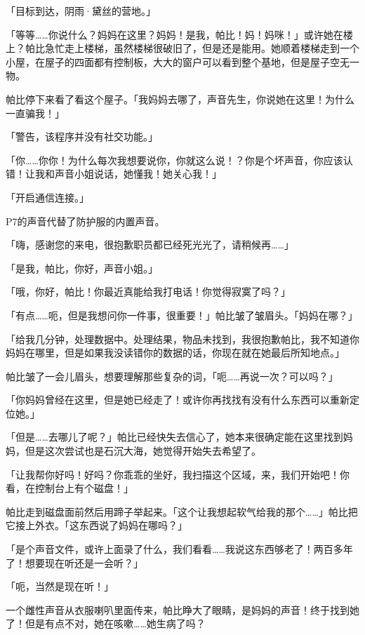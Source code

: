 「目标到达，阴雨·黛丝的营地。」

「等等……你说什么？妈妈在这里？妈妈！是我，帕比！妈！妈咪！」或许她在楼上？帕比急忙走上楼梯，虽然楼梯很破旧了，但是还是能用。她顺着楼梯走到一个小屋，在屋子的四面都有控制板，大大的窗户可以看到整个基地，但是屋子空无一物。

帕比停下来看了看这个屋子。「我妈妈去哪了，声音先生，你说她在这里！为什么一直骗我！」

「{\mtzh 警告，该程序并没有社交功能。}」

「你……你你！为什么每次我想要说你，你就这么说！？你是个坏声音，你应该认错！让我和声音小姐说话，她懂我！她关心我！」

「{\mtzh 开启通信连接。}」

 P7的声音代替了防护服的内置声音。

「嗨，感谢您的来电，很抱歉职员都已经死光光了，请稍候再……」

「是我，帕比，你好，声音小姐。」

「哦，你好，帕比！你最近真能给我打电话！你觉得寂寞了吗？」

「有点……呃，但是我想问你一件事，很重要！」帕比皱了皱眉头。「妈妈在哪？」

「给我几分钟，处理数据中。处理结果，物品未找到，我很抱歉帕比，我不知道你妈妈在哪里，但是如果我没读错你的数据的话，你现在就在她最后所知地点。」

帕比皱了一会儿眉头，想要理解那些复杂的词，「呃……再说一次？可以吗？」

「你妈妈曾经在这里，但是她已经走了！或许你再找找有没有什么东西可以重新定位她。」

「但是……去哪儿了呢？」帕比已经快失去信心了，她本来很确定能在这里找到妈妈，但是这次尝试也是石沉大海，她觉得开始失去希望了。

「让我帮你好吗！好吗？你乖乖的坐好，我扫描这个区域，来，我们开始吧！你看，在控制台上有个磁盘！」

帕比走到磁盘面前然后用蹄子举起来。「这个让我想起软气给我的那个……」帕比把它接上外衣。「这东西说了妈妈在哪吗？」

「是个声音文件，或许上面录了什么，我们看看……我说这东西够老了！两百多年了！想要现在听还是一会听？」

「呃，当然是现在听！」

一个雌性声音从衣服喇叭里面传来，帕比睁大了眼睛，是妈妈的声音！终于找到她了！但是有点不对，她在咳嗽……她生病了吗？


